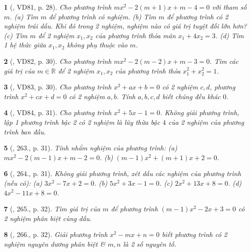 \documentclass{article}
\newtheorem{baitoan}{}
\begin{document}
\begin{baitoan}[\cite{Binh_Toan_9_tap_2}, VD81, p. 28]
	Cho phương trình $mx^2 - 2(m + 1)x + m - 4 = 0$ với tham số $m$. (a) Tìm $m$ để phương trình có nghiệm. (b) Tìm $m$ để phương trình có 2 nghiệm trái dấu. Khi đó trong 2 nghiệm, nghiệm nào có giá trị tuyệt đối lớn hơn? (c) Tìm $m$ để 2 nghiệm $x_1,x_2$ của phương trình thỏa mãn $x_1 + 4x_2 = 3$. (d) Tìm 1 hệ thức giữa $x_1,x_2$ không phụ thuộc vào $m$.
\end{baitoan}

\begin{baitoan}[\cite{Binh_Toan_9_tap_2}, VD82, p. 30]
	Cho phương trình $mx^2 - 2(m - 2)x + m - 3 = 0$. Tìm các giá trị của $m\in\mathbb{R}$ để 2 nghiệm $x_1,x_2$ của phương trình thỏa $x_1^2 + x_2^2 = 1$.
\end{baitoan}

\begin{baitoan}[\cite{Binh_Toan_9_tap_2}, VD83, p. 30]
	Cho phương trình $x^2 + ax + b = 0$ có 2 nghiệm $c,d$, phương trình $x^2 + cx + d = 0$ có 2 nghiệm $a,b$. Tính $a,b,c,d$ biết chúng đều khác $0$.
\end{baitoan}

\begin{baitoan}[\cite{Binh_Toan_9_tap_2}, VD84, p. 31]
	Cho phương trình $x^2 + 5x - 1 = 0$. Không giải phương trình, lập 1 phương trình bậc 2 có 2 nghiệm là lũy thừa bậc $4$ của 2 nghiệm của phương trình ban đầu.
\end{baitoan}

\begin{baitoan}[\cite{Binh_Toan_9_tap_2}, 263., p. 31]
	Tính nhẩm nghiệm của phương trình: (a) $mx^2 - 2(m - 1)x + m - 2 = 0$. (b) $(m - 1)x^2 + (m + 1)x + 2 = 0$.
\end{baitoan}

\begin{baitoan}[\cite{Binh_Toan_9_tap_2}, 264., p. 31]
	Không giải phương trình, xét dấu các nghiệm của phương trình (nếu có): (a) $3x^2 - 7x + 2 = 0$. (b) $5x^2 + 3x - 1 = 0$. (c) $2x^2 + 13x + 8 = 0$. (d) $4x^2 - 11x + 8 = 0$.
\end{baitoan}

\begin{baitoan}[\cite{Binh_Toan_9_tap_2}, 265., p. 32]
	Tìm giá trị của $m$ để phương trình $(m - 1)x^2 - 2x + 3 = 0$ có 2 nghiệm phân biệt cùng dấu.
\end{baitoan}

\begin{baitoan}[\cite{Binh_Toan_9_tap_2}, 266., p. 32]
	Giải phương trình $x^2 - mx + n = 0$ biết phương trình có 2 nghiệm nguyên dương phân biệt \& $m,n$ là 2 số nguyên tố.
\end{baitoan}
\end{document}
